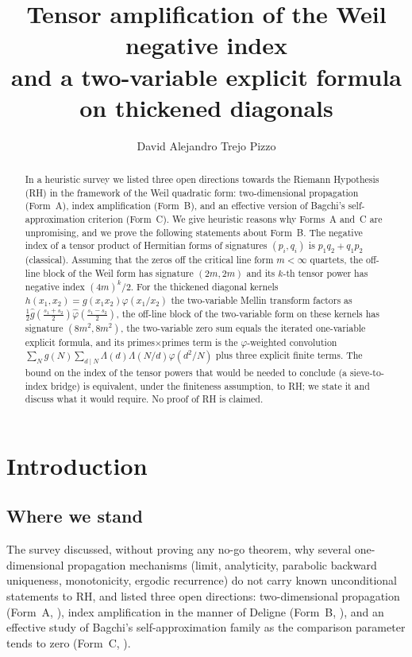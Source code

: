 \documentclass[11pt]{amsart}
\title[Tensor amplification of the Weil negative index]{Tensor amplification of the Weil
negative index\\ and a two-variable explicit formula\\ on thickened diagonals}
\author{David Alejandro Trejo Pizzo}
\theoremstyle{definition}
\theoremstyle{remark}
\begin{document}
\begin{abstract}
In a heuristic survey \cite{P27} we listed three open directions towards the Riemann
Hypothesis (RH) in the framework of the Weil quadratic form: two-dimensional propagation
(Form~A), index amplification (Form~B), and an effective version of Bagchi's self-approximation
criterion (Form~C). We give heuristic reasons why Forms~A and~C are unpromising, and we prove
the following statements about Form~B. The negative index of a tensor product of Hermitian forms
of signatures $(p_i,q_i)$ is $p_1q_2+q_1p_2$ (classical). Assuming that the zeros off the
critical line form $m<\infty$ quartets, the off-line block of the Weil form has signature
$(2m,2m)$ and its $k$-th tensor power has negative index $(4m)^k/2$. For the thickened diagonal
kernels $h(x_1,x_2)=g(x_1x_2)\varphi(x_1/x_2)$ the two-variable Mellin transform factors as
$\tfrac12\hat g(\tfrac{s_1+s_2}{2})\hat\varphi(\tfrac{s_1-s_2}{2})$, the off-line block of the
two-variable form on these kernels has signature $(8m^2,8m^2)$, the two-variable zero sum equals
the iterated one-variable explicit formula, and its primes$\times$primes term is the
$\varphi$-weighted convolution
$\sum_N g(N)\sum_{d\mid N}\Lambda(d)\Lambda(N/d)\varphi(d^2/N)$ plus three explicit finite
terms. The bound on the index of the tensor powers that would be needed to conclude (a
sieve-to-index bridge) is equivalent, under the finiteness assumption, to RH; we state it and discuss what it would require.
No proof of RH is claimed.
\end{abstract}

\maketitle
\tableofcontents
\newpage

\section{Introduction}

\subsection{Where we stand}
The survey \cite{P27} discussed, without proving any no-go theorem, why several
one-dimensional propagation mechanisms (limit, analyticity, parabolic backward uniqueness,
monotonicity, ergodic recurrence) do not carry known unconditional statements to RH, and listed
three open directions: two-dimensional propagation (Form~A, \cite[Problem~6.1]{P27}), index
amplification in the manner of Deligne (Form~B, \cite[Problem~7.1]{P27}), and an effective
study of Bagchi's self-approximation family as the comparison parameter tends to zero (Form~C,
\cite[Problem~8.1]{P27}).
\end{document}

